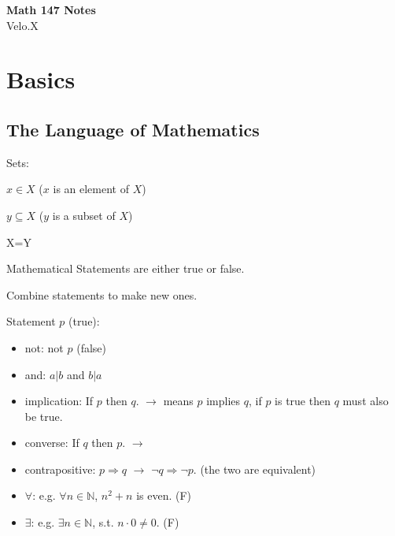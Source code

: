 \documentclass[12pt]{article}
\theoremstyle{plain}
\begin{document}
\begin{titlepage}
\begin{center}
    \textbf{\large Math 147  Notes}\\[1ex]
   	\large{Velo.X}\\ 
\end{center}
\end{titlepage}
\newpage

\tableofcontents\label{toc}

\newpage
\section{Basics}
	\subsection{The Language of Mathematics}
	Sets: 
	\begin{description}
		\item $x\in X$ ($x$ is an element of $X$)
		\item $y \subseteq X$ ($y$ is a subset of $X$)
		\item X=Y
	\end{description}

	Mathematical Statements are either true or false.

	Combine statements to make new ones. 

	Statement $p$ (true): 

	\begin{itemize}
		\item not: not $p$ (false)

		\item and: $a|b$ and $b|a$

		\item implication: If $p$ then $q$. 
			$\rightarrow$ means $p$ implies $q$, 
			if $p$ is true then $q$ must also be true. 

		\item converse: If $q$ then $p$. $\rightarrow$ 

		\item contrapositive: 
			$p \Rightarrow q$ $\rightarrow$ $\neg q \Rightarrow \neg p$. 
			(the two are equivalent)
	
	        \item $\forall$: e.g. $\forall n \in \mathbb{N}$, 
	        	$n^2+n$ is even. (F)
	        
	        \item $\exists$: e.g. $\exists n \in \mathbb{N}$,
	        	s.t. $n \cdot 0 \neq 0$. (F)
	    \end{itemize}
	
\end{document}
